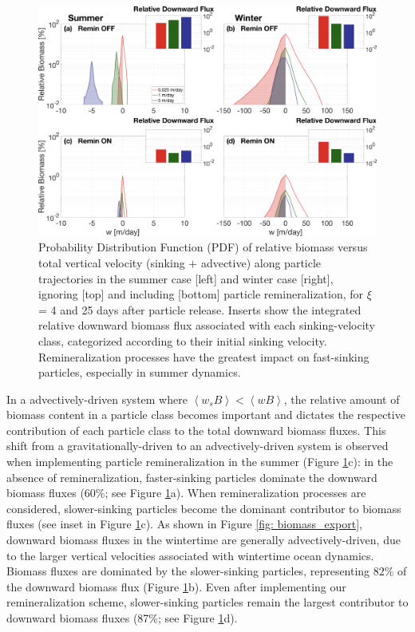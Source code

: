 \documentclass[article,linenumbers]{agujournal2018}
\begin{document}
	\begin{figure}[t!]
		\centering
		\includegraphics[width = 1\linewidth]{Fig8.png}
		\caption{Probability Distribution Function (PDF) of relative biomass versus total vertical velocity (sinking + advective) along particle trajectories in the summer case [left] and winter case [right], ignoring [top] and including [bottom] particle remineralization, for $\xi$ = 4 and 25 days after particle release. Inserts show the integrated relative downward biomass flux associated with each sinking-velocity class, categorized according to their initial sinking velocity. Remineralization processes have the greatest impact on fast-sinking particles, especially in summer dynamics.}	
		\label{fig: biomass_export_remin}
	\end{figure}
	In a advectively-driven system where $\left<w_sB\right> < \left<wB\right>$, the relative amount of biomass content in a particle class becomes important and dictates the respective contribution of each particle class to the total downward biomass fluxes. This shift from a gravitationally-driven to an advectively-driven system is observed when implementing particle remineralization in the summer (Figure \ref{fig: biomass_export_remin}c): in the absence of remineralization, faster-sinking particles dominate the downward biomass fluxes (60\%; see Figure \ref{fig: biomass_export_remin}a). When remineralization processes are considered, slower-sinking particles become the dominant contributor to biomass fluxes (see inset in Figure \ref{fig: biomass_export_remin}c). As shown in Figure \ref{fig: biomass_export}, downward biomass fluxes in the wintertime are generally advectively-driven, due to the larger vertical velocities associated with wintertime ocean dynamics. Biomass fluxes are dominated by the slower-sinking particles, representing 82\% of the downward biomass flux (Figure \ref{fig: biomass_export_remin}b). Even after implementing our remineralization scheme, slower-sinking particles remain the largest contributor to downward biomass fluxes (87\%; see Figure \ref{fig: biomass_export_remin}d).
	
\end{document}
